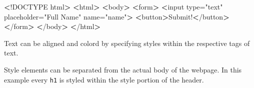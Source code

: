 \documentclass[]{book}
\newenvironment{Shaded}{\begin{snugshade}}{\end{snugshade}}
\newcommand{\ExtensionTok}[1]{#1}
\newcommand{\NormalTok}[1]{#1}
\newcommand{\OperatorTok}[1]{\textcolor[rgb]{0.81,0.36,0.00}{\textbf{#1}}}
\newcommand{\StringTok}[1]{\textcolor[rgb]{0.31,0.60,0.02}{#1}}
\begin{document}
\begin{Shaded}
\begin{Highlighting}[]
\OperatorTok{<}\NormalTok{!}\ExtensionTok{DOCTYPE}\NormalTok{ html}\OperatorTok{>}         
\OperatorTok{<}\ExtensionTok{html}\OperatorTok{>}                  
    \OperatorTok{<}\ExtensionTok{body}\OperatorTok{>}              
        \OperatorTok{<}\ExtensionTok{form}\OperatorTok{>}                                                     
            \OperatorTok{<}\ExtensionTok{input}\NormalTok{ type=}\StringTok{"text"}\NormalTok{ placeholder=}\StringTok{"Full Name"}\NormalTok{ name=}\StringTok{"name"}\OperatorTok{>}
            \OperatorTok{<}\ExtensionTok{button}\OperatorTok{>}\NormalTok{Submit!}\OperatorTok{<}\NormalTok{/button}\OperatorTok{>}                               
        \OperatorTok{<}\NormalTok{/}\ExtensionTok{form}\OperatorTok{>}                                                    
    \OperatorTok{<}\NormalTok{/}\ExtensionTok{body}\OperatorTok{>}             
\OperatorTok{<}\NormalTok{/}\ExtensionTok{html}\OperatorTok{>}                 
\end{Highlighting}
\end{Shaded}

Text can be aligned and colord by specifying styles within the respective tags of text.

\begin{Shaded}
\end{Shaded}

Style elements can be separated from the actual body of the webpage.
In this example every \texttt{h1} is styled within the style portion of the header.
\end{document}
